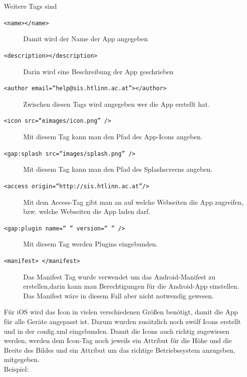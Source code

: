 \newpage
 



Weitere Tags sind\\
\begin{description}
\item[\texttt{<name></name>}] Damit wird der Name der App angegeben
\item[\texttt{<description></description>}] Darin wird eine Beschreibung der App geschrieben
\item[\texttt{<author email=\enquote{help@sis.htlinn.ac.at}></author>}] Zwischen diesen Tags wird angegeben wer die App erstellt hat.
\item[\texttt{<icon src=\enquote{eimages/icon.png} />}] Mit diesem Tag kann man den Pfad des App-Icons angeben.
\item[\texttt{<gap:splash src=\enquote{images/splash.png} />}] Mit diesem Tag kann man den Pfad des Splashscreens angeben.
\item[\texttt{<access origin=\enquote{http://sis.htlinn.ac.at}/>}]Mit dem Access-Tag gibt man an auf welche Webseiten die App zugreifen, bzw. welche Webseiten die App laden darf.
\item[\texttt{<gap:plugin name=\enquote{ } version=\enquote{ } />}] Mit diesem Tag werden Plugins eingebunden.
\item[\texttt{<manifest> </manifest>}] Das Manifest Tag wurde verwendet um das Android-Manifest zu erstellen,darin kann man	Berechtigungen für die Android-App einstellen. Das Manifest wäre in diesem Fall aber nicht notwendig gewesen.
\end{description}

Für iOS wird das Icon in vielen verschiedenen Größen benötigt, damit die App für alle Geräte angepasst ist. Darum wurden zusätzlich noch zwölf Icons erstellt und in der config.xml eingebunden. Damit die Icons auch richtig zugewiesen werden, werden dem Icon-Tag noch jeweils ein Attribut für die Höhe und die Breite des Bildes und ein Attribut um das richtige Betriebssystem anzugeben, mitgegeben.\\
Beispiel:\\


	

